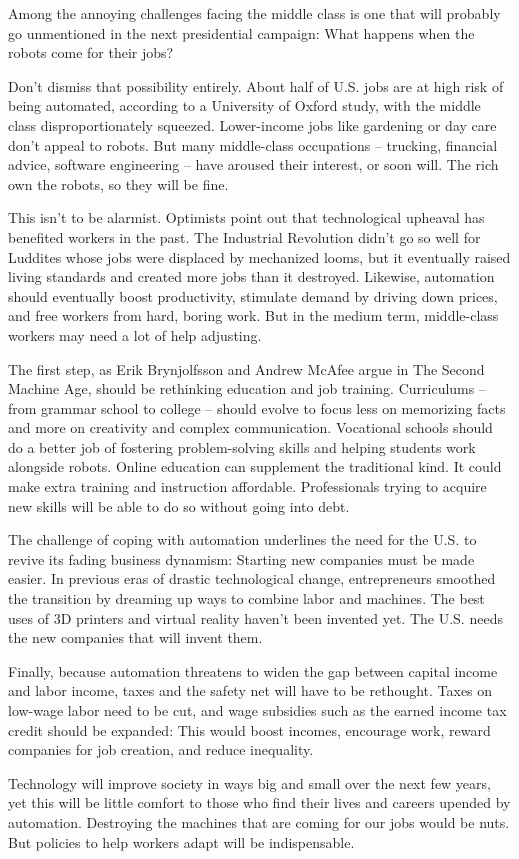 Among the annoying challenges facing the middle class is one that will probably go unmentioned in the next presidential campaign: What happens when the robots come for their jobs?


Don't dismiss that possibility entirely. About half of U.S. jobs are at high risk of being automated, according to a University of Oxford study, with the middle class disproportionately squeezed. Lower-income jobs like gardening or day care don't appeal to robots. But many middle-class occupations – trucking, financial advice, software engineering – have aroused their interest, or soon will. The rich own the robots, so they will be fine.


This isn't to be alarmist. Optimists point out that technological upheaval has benefited workers in the past. The Industrial Revolution didn't go so well for Luddites whose jobs were displaced by mechanized looms, but it eventually raised living standards and created more jobs than it destroyed. Likewise, automation should eventually boost productivity, stimulate demand by driving down prices, and free workers from hard, boring work. But in the medium term, middle-class workers may need a lot of help adjusting.


The first step, as Erik Brynjolfsson and Andrew McAfee argue in The Second Machine Age, should be rethinking education and job training. Curriculums – from grammar school to college – should evolve to focus less on memorizing facts and more on creativity and complex communication. Vocational schools should do a better job of fostering problem-solving skills and helping students work alongside robots. Online education can supplement the traditional kind. It could make extra training and instruction affordable. Professionals trying to acquire new skills will be able to do so without going into debt.


The challenge of coping with automation underlines the need for the U.S. to revive its fading business dynamism: Starting new companies must be made easier. In previous eras of drastic technological change, entrepreneurs smoothed the transition by dreaming up ways to combine labor and machines. The best uses of 3D printers and virtual reality haven't been invented yet. The U.S. needs the new companies that will invent them.


Finally, because automation threatens to widen the gap between capital income and labor income, taxes and the safety net will have to be rethought. Taxes on low-wage labor need to be cut, and wage subsidies such as the earned income tax credit should be expanded: This would boost incomes, encourage work, reward companies for job creation, and reduce inequality.


Technology will improve society in ways big and small over the next few years, yet this will be little comfort to those who find their lives and careers upended by automation. Destroying the machines that are coming for our jobs would be nuts. But policies to help workers adapt will be indispensable.